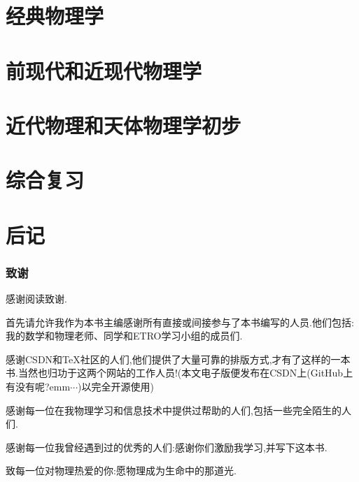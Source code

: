 \documentclass[UTF8,a4paper]{ctexrep}
\begin{document}
	\part{ 经典物理学}
	
	\newpage
	
	\newpage
	
	\newpage
	
	\newpage
	
	\newpage
	
	\newpage
	
	\newpage
	
	\newpage
	\part{前现代和近现代物理学}
	
	\newpage
	
	\newpage
	
	\newpage
	
	\newpage
	
	\newpage 
	\part{近代物理和天体物理学初步}
	
	\newpage
	
	\newpage
	\part{综合复习}
	
	\newpage
	\part{后记}
	\section*{致谢} 
	感谢阅读致谢.
	
	
	首先请允许我作为本书主编感谢所有直接或间接参与了本书编写的人员.他们包括:我的数学和物理老师、同学和ETRO学习小组的成员们.
	
	
	感谢CSDN和\TeX 社区的人们,他们提供了大量可靠的排版方式,才有了这样的一本书.当然也归功于这两个网站的工作人员!(本文电子版便发布在CSDN上(GitHub上有没有呢?emm$\cdots$)以完全开源使用)
	
	
	感谢每一位在我物理学习和信息技术中提供过帮助的人们,包括一些完全陌生的人们.
	
	
	感谢每一位我曾经遇到过的优秀的人们:感谢你们激励我学习,并写下这本书.
	
	
	致每一位对物理热爱的你:愿物理成为生命中的那道光.
	\newpage
	 
	
		
	 
	
\end{document}
